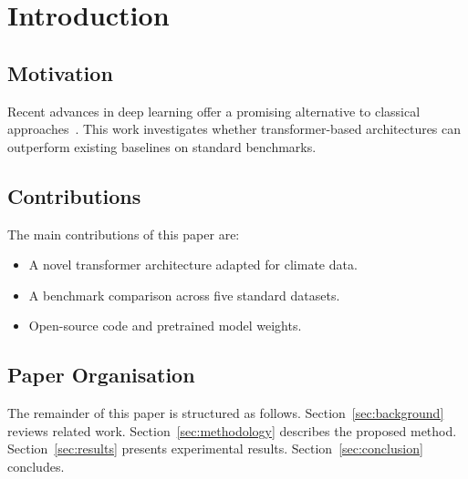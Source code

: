 \section{Introduction}
\label{sec:introduction}


\subsection{Motivation}
\label{subsec:motivation}

Recent advances in deep learning offer a promising alternative
to classical approaches~\cite{jones2021dl}.
This work investigates whether transformer-based architectures
can outperform existing baselines on standard benchmarks.

\subsection{Contributions}
\label{subsec:contributions}

The main contributions of this paper are:
\begin{itemize}
    \item A novel transformer architecture adapted for climate data.
    \item A benchmark comparison across five standard datasets.
    \item Open-source code and pretrained model weights.
\end{itemize}

\subsection{Paper Organisation}
\label{subsec:organisation}

The remainder of this paper is structured as follows.
Section~\ref{sec:background} reviews related work.
Section~\ref{sec:methodology} describes the proposed method.
Section~\ref{sec:results} presents experimental results.
Section~\ref{sec:conclusion} concludes.